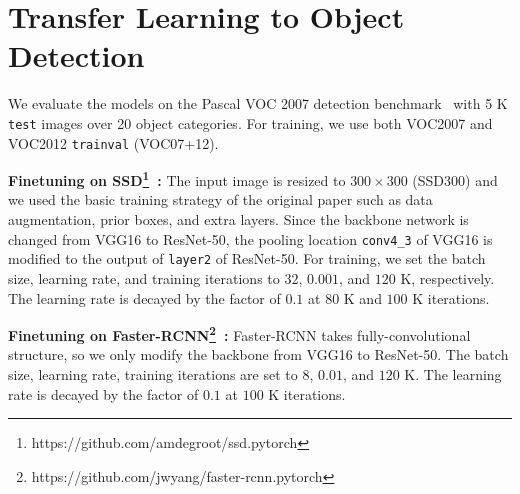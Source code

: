 \section{Transfer Learning to Object Detection}
\label{appendix:Detection}

We evaluate the models on the Pascal VOC 2007 detection benchmark~\cite{pascalvoc} with 5 K \texttt{test} images over 20 object categories.
For training, we use both VOC2007 and VOC2012 \texttt{trainval} (VOC07+12). 


\noindent\textbf{Finetuning on SSD\footnote{https://github.com/amdegroot/ssd.pytorch}~\cite{liu2016ssd}: }
The input image is resized to $300 \times 300$ (SSD300) and we used the basic training strategy of the original paper such as data augmentation, prior boxes, and extra layers. 
Since the backbone network is changed from VGG16 to ResNet-50, the pooling location \texttt{conv4\_3} of VGG16 is modified to the output of \texttt{layer2} of ResNet-50.
For training, we set the batch size, learning rate, and training iterations to $32$, $0.001$, and  $120$ K, respectively.
The learning rate is decayed by the factor of $0.1$ at $80$ K and $100$ K iterations. 


\noindent\textbf{Finetuning on Faster-RCNN\footnote{https://github.com/jwyang/faster-rcnn.pytorch}~\cite{fasterrcnn}: }
Faster-RCNN takes fully-convolutional structure, so we only modify the backbone from VGG16 to ResNet-50. 
The batch size, learning rate, training iterations are set to $8$, $0.01$, and $120$ K.
The learning rate is decayed by the factor of $0.1$ at $100$ K iterations.
